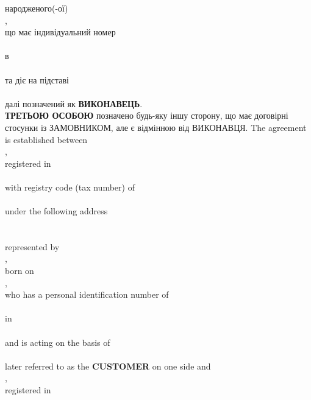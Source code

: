 \begin{Form}
\begin{paracol}{3}
{          народженого(-ої)\\
          ,\\
          що має індивідуальний номер\\
          \\
          в \\
          \\
          та діє на підставі\\
          \\
          далі позначений як \textbf{ВИКОНАВЕЦЬ}.\\
          \textbf{ТРЕТЬОЮ ОСОБОЮ} позначено будь-яку іншу сторону, що має договірні стосунки із ЗАМОВНИКОМ, але є відмінною від ВИКОНАВЦЯ.
        }
        { The agreement is established between \\
          ,\\
          registered in\\
          \\
          with registry code (tax number) of \\
          \\
          under the following address\\
          \\
          \\
          represented by\\
          ,\\
          born on\\
          ,\\
          who has a personal identification number of\\
          \\
          in \\
          \\
          and is acting on the basis of\\
          \\
          later referred to as the \textbf{CUSTOMER} on one side and \\
          ,\\
          registered in\\
          \\
}
\end{paracol}
\end{Form}
